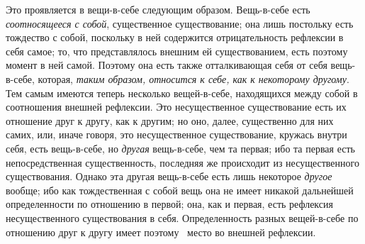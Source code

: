 Это проявляется в вещи-в-себе следующим образом. Вещь-в-себе есть
{\em соотносящееся с собой}, существенное
существование; она лишь постольку есть тождество с собой, поскольку в ней
содержится отрицательность рефлексии в себя самое; то, что представлялось
внешним ей существованием, есть поэтому момент в ней самой. Поэтому она
есть также отталкивающая себя от себя вещь-в-себе, которая,
{\em таким образом, относится к себе, как к некоторому
другому}. Тем самым имеются теперь несколько вещей-в-себе, находящихся
между собой в соотношения внешней рефлексии. Это несущественное
существование есть их отношение друг к другу, как к другим; но оно, далее,
существенно для них самих, или, иначе говоря, это несущественное
существование, кружась внутри себя, есть вещь-в-себе, но
{\em другая} вещь-в-себе, чем та первая; ибо та первая
есть непосредственная существенность, последняя же происходит из
несущественного существования. Однако эта другая вещь-в-себе есть лишь
некоторое {\em другое} вообще; ибо как тождественная с
собой вещь она не имеет никакой дальнейшей определенности по отношению в
первой; она, как и первая, есть рефлексия несущественного существования в
себя. Определенность разных вещей-в-себе по отношению друг к другу имеет
поэтому \ место во внешней рефлексии.

